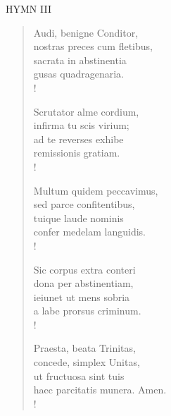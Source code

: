 \noindent\small{\uppercase{Hymn III }}\normalsize\label{lent:lastHymn}
\begin{verse}
Audi, benigne Conditor,\\
nostras preces cum fletibus,\\
sacrata in abstinentia\\
gusas quadragenaria.\\!

Scrutator alme cordium,\\
infirma tu scis virium;\\
ad te reverses exhibe\\
remissionis gratiam.\\!

Multum quidem peccavimus,\\
sed parce confitentibus,\\
tuique laude nominis\\
confer medelam languidis.\\!

Sic corpus extra conteri\\
dona per abstinentiam,\\
ieiunet ut mens sobria\\
a labe prorsus criminum.\\!

Praesta, beata Trinitas,\\
concede, simplex Unitas,\\
ut fructuosa sint tuis\\
haec parcitatis munera. Amen.\\!
\end{verse}
